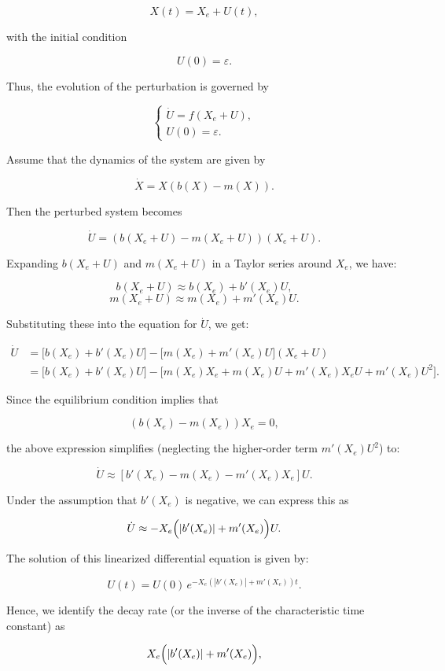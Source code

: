 $$
X(t) = X_e + U(t),
$$

with the initial condition

$$
U(0) = \varepsilon.
$$

Thus, the evolution of the perturbation is governed by

$$
\begin{cases}
\dot U = f(X_e + U), \\
U(0) = \varepsilon.
\end{cases}
$$

Assume that the dynamics of the system are given by

$$
\dot X = X(b(X) - m(X)).
$$

Then the perturbed system becomes

$$
\dot U = (b(X_e + U) - m(X_e + U))(X_e + U).
$$

Expanding $b(X_e + U)$ and $m(X_e + U)$ in a Taylor series around $X_e$, we have:

$$
b(X_e + U) \approx b(X_e) + b'(X_e)U,
$$
$$
m(X_e + U) \approx m(X_e) + m'(X_e)U.
$$

Substituting these into the equation for $\dot U$, we get:

$$
\begin{array}{rl}
\dot U & = \bigl[b(X_e) + b'(X_e)U\bigr] - \bigl[m(X_e) + m'(X_e)U\bigr](X_e + U) \\
      & = \bigl[b(X_e) + b'(X_e)U\bigr] - \bigl[m(X_e)X_e + m(X_e)U + m'(X_e)X_eU + m'(X_e)U^2\bigr].
\end{array}
$$

Since the equilibrium condition implies that

$$
(b(X_e) - m(X_e))X_e = 0,
$$

the above expression simplifies (neglecting the higher-order term $m'(X_e)U^2$) to:

$$
\dot U \approx \left[b'(X_e) - m(X_e) - m'(X_e)X_e\right] U.
$$

Under the assumption that $b'(X_e)$ is negative, we can express this as

$$
\dot U \approx -X_e\Bigl(|b'(X_e)| + m'(X_e)\Bigr)U.
$$

The solution of this linearized differential equation is given by:

$$
U(t) = U(0)\,e^{-X_e (|b'(X_e)| + m'(X_e))t}.
$$

Hence, we identify the decay rate (or the inverse of the characteristic time constant) as

$$
X_e\Bigl(|b'(X_e)| + m'(X_e)\Bigr),
$$

